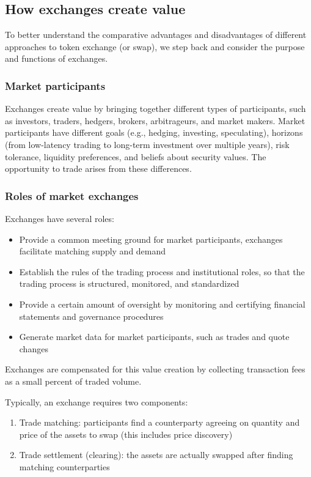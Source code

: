 \documentclass[11pt, reqno]{amsart}
\theoremstyle{definition}
\theoremstyle{remark}
\begin{document}
\subsection{How exchanges create value}
To better understand the comparative advantages and disadvantages of different
approaches to token exchange (or swap), we step back and consider the purpose and
functions of exchanges.

\subsubsection{Market participants}
Exchanges create value by bringing together different types of participants,
such as investors, traders, hedgers, brokers, arbitrageurs, and market makers.
Market participants have different goals (e.g., hedging, investing,
speculating), horizons (from low-latency trading to long-term investment over
multiple years), risk tolerance, liquidity preferences, and beliefs about
security values. The opportunity to trade arises from these differences.

\subsubsection{Roles of market exchanges}

Exchanges have several roles:
\begin{itemize}
    \item Provide a common meeting ground for market participants, exchanges
          facilitate matching supply and demand
	\item Establish the rules of the trading process and institutional roles, so
          that the trading process is structured, monitored, and standardized
	\item Provide a certain amount of oversight by monitoring and certifying
          financial statements and governance procedures
    \item Generate market data for market participants, such as trades and
          quote changes
\end{itemize}

Exchanges are compensated for this value creation by collecting transaction
fees as a small percent of traded volume.

Typically, an exchange requires two components:
\begin{enumerate}
	\item Trade matching: participants find a counterparty agreeing on quantity
	      and price of the assets to swap (this includes price discovery)
    \item Trade settlement (clearing): the assets are actually swapped after
          finding matching counterparties
\end{enumerate}
\end{document}
